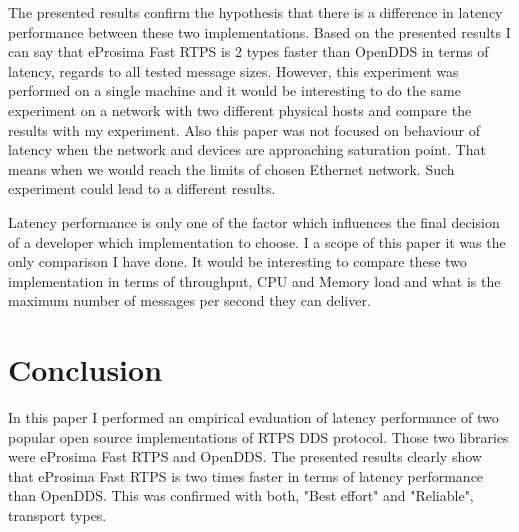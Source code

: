 \documentclass{csfourzero}
\begin{document}
\quad The presented results confirm the hypothesis that there is a difference in latency performance between these two implementations. Based on the presented results I can say that eProsima Fast RTPS is 2 types faster than OpenDDS in terms of latency, regards to all tested message sizes. However, this experiment was performed on a single machine and it would be interesting to do the same experiment on a network with two different physical hosts and compare the results with my experiment. Also this paper was not focused on behaviour of latency when the network and devices are approaching saturation point. That means when we would reach the limits of chosen Ethernet network. Such experiment could lead to a different results. 

Latency performance is only one of the factor which influences the final decision of a developer which implementation to choose. I a scope of this paper it was the only comparison I have done. It would be interesting to compare these two implementation in terms of throughput, CPU and Memory load and what is the maximum number of messages per second they can deliver. 

\section{Conclusion}
\label{sec:conc}

\quad In this paper I performed an empirical evaluation of latency performance of two popular open source implementations of RTPS DDS protocol. Those two libraries were eProsima Fast RTPS and OpenDDS. The presented results clearly show that eProsima Fast RTPS is two times faster in terms of latency performance than OpenDDS. This was confirmed with both, "Best effort" and "Reliable", transport types.


\end{document}
